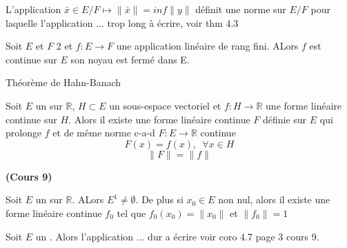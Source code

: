 \documentclass[12pt,a4paper]{article}
\begin{document}
\begin{flushleft}
\begin{thm}
L'application $\bar{x} \in E/F \mapsto \lVert \bar{x} \rVert = inf \lVert y \rVert$ définit une norme sur $E/F$ pour laquelle l'application ... trop long à écrire, voir thm 4.3
\end{thm}

\begin{thm}
Soit $E$ et $F$ 2 \evn et $f: E \longrightarrow F$ une application linéaire de rang fini. ALors $f$ est continue sur $E$ \ssi son noyau est fermé dans E.
\end{thm}

Théorème de Hahn-Banach
\begin{thm}
Soit $E$ un \evn sur $\mathbb{R}$, $H \subset E$ un sous-espace vectoriel et $f: H \longrightarrow \mathbb{R}$ une forme linéaire continue sur $H$. Alors il existe une forme linéaire continue $F$ définie sur $E$ qui prolonge $f$ et de même norme c-a-d $F: E \longrightarrow \mathbb{R}$ continue $$F(x) = f(x), \enspace \forall x \in H$$ $$\lVert F \rVert = \lVert f \rVert $$
\end{thm}


\textbf{(Cours 9)}



\begin{cor}
Soit $E$ un \evn sur $\mathbb{R}$. ALors $E^1 \neq \emptyset$. De plus si $x_0 \in E$ non nul, alors il existe une forme linéaire continue $f_0$ tel que $f_0 (x_0) = \lVert x_0 \rVert$ et $\lVert f_0 \rVert = 1$
\end{cor}

\begin{cor}
Soit $E$ un \evn . Alors l'application ... dur a écrire voir coro 4.7 page 3 cours 9.
\end{cor}


\end{flushleft}
\end{document}
